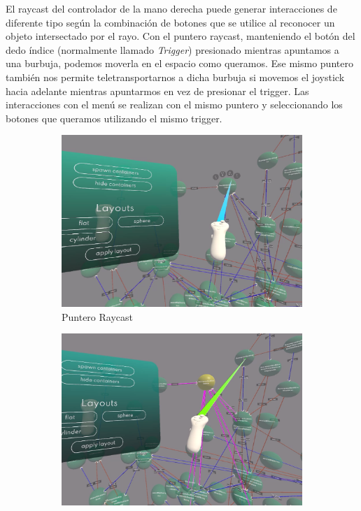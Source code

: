 El raycast del controlador de la mano derecha puede generar interacciones de diferente tipo según la combinación de botones que se utilice al reconocer un objeto intersectado por el rayo. Con el puntero raycast, manteniendo el botón del dedo índice (normalmente llamado \textit{Trigger}) presionado mientras apuntamos a una burbuja, podemos moverla en el espacio como queramos. Ese mismo puntero también nos permite teletransportarnos a dicha burbuja si movemos el joystick hacia adelante mientras apuntarmos en vez de presionar el trigger. Las interacciones con el menú se realizan con el mismo puntero y seleccionando los botones que queramos utilizando el mismo trigger.

\begin{figure}[ht]
   \centering
   \begin{subfigure}{0.45\textwidth}
       \centering
       \includegraphics[width=\textwidth]{chapter2/figures/raycast.png}
       \caption{Puntero Raycast}
   \end{subfigure}
   \hfill
   \begin{subfigure}{0.45\textwidth}
       \centering
       \includegraphics[width=\textwidth]{chapter2/figures/teleport.png}

\end{subfigure}
\end{figure}
